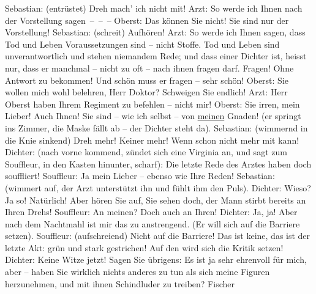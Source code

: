 \begin{ledgroupsized}[t]{13cm}
           Sebastian: (entrüstet)  Dreh mach’ ich nicht mit!\pend
           \pstart
           Arzt: So werde ich Ihnen nach der Vorstellung sagen – – –\pend
           \pstart
           Oberst: Das können Sie nicht! Sie sind nur  der
               Vorstellung!\pend
           \pstart
           Sebastian: (schreit) Aufhören!\pend
           \pstart
           Arzt: So werde ich Ihnen sagen, dass Tod und Leben Voraussetzungen sind – nicht
               Stoffe. Tod und Leben sind unverantwortlich und stehen niemandem Rede; und dass einer
               Dichter ist, heisst nur, dass er manchmal – nicht zu oft – nach ihnen fragen darf.
               Fragen! Ohne Antwort zu bekommen! Und schön muss er fragen – sehr schön!\pend
           \pstart
           Oberst: Sie wollen mich wohl belehren, Herr Doktor? Schweigen Sie endlich!\pend
           \pstart
           Arzt: Herr Oberst haben Ihrem Regiment zu befehlen – nicht mir!\pend
           \pstart
           Oberst: Sie irren, mein Lieber! Auch Ihnen! Sie sind – wie ich selbst – von \uline{meinen} Gnaden! (er springt ins Zimmer, die Maske fällt
               ab – der Dichter steht da).\pend
           \pstart
           Sebastian: (wimmernd in die Knie sinkend)  Dreh mehr!
               Keiner mehr! Wenn  schon nicht mehr mit kann!\pend
           \pstart
           Dichter: (nach vorne kommend, zündet sich eine Virginia an, und sagt zum Souffleur,
               in den Kasten hinunter, scharf): {\pb}Die letzte Rede des Arztes haben doch 
               souffliert!\pend
           \pstart
           Souffleur: Ja mein Lieber – ebenso wie Ihre Reden!\pend
           \pstart
           Sebastian: (wimmert auf, der Arzt unterstützt ihn und fühlt ihm den Puls).\pend
           \pstart
           Dichter: Wieso? Ja so! Natürlich! Aber hören Sie auf, Sie sehen doch, der Mann stirbt
               bereits an Ihren Drehs!\pend
           \pstart
           Souffleur: An meinen? Doch auch an Ihren!\pend
           \pstart
           Dichter: Ja, ja! Aber nach dem Nachtmahl ist mir das zu anstrengend. (Er will sich
               auf die Barriere setzen).\pend
           \pstart
           Souffleur: (aufschreiend) Nicht auf die Barriere! Das ist keine, das ist der letzte
               Akt: grün und stark gestrichen! Auf den wird sich die Kritik setzen!\pend
           \pstart
           Dichter: Keine Witze jetzt! Sagen Sie übrigens: Es ist ja sehr ehrenvoll für mich,
               aber – haben Sie wirklich nichts anderes zu tun als sich meine Figuren herzunehmen,
               und mit ihnen Schindluder zu treiben? Fischer

\end{ledgroupsized}
